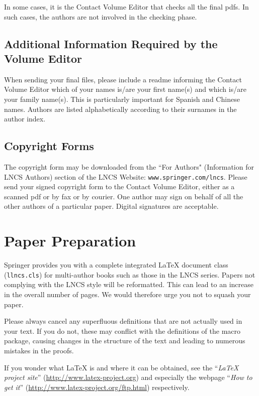 \documentclass[runningheads]{llncs}
\begin{document}
In some cases, it is the Contact Volume Editor that checks all the final
pdfs. In such cases, the authors are not involved in the checking phase.

\subsection{Additional Information Required by the Volume Editor}

When sending your final files, please include a readme informing the
Contact Volume Editor which of your names is/are your first name(s) and
which is/are your family name(s). This is particularly important for
Spanish and Chinese names. Authors are listed alphabetically according
to their surnames in the author index.

\subsection{Copyright Forms}

The copyright form may be downloaded from the ``For Authors"
(Information for LNCS Authors)
section of the LNCS Website: \texttt{www.springer.com/lncs}.
Please send your signed copyright
form to the Contact Volume Editor, either as a scanned pdf or by fax or
by courier. One author may sign on behalf of all the other authors of a particular
paper. Digital signatures are acceptable.

\section{Paper Preparation}

Springer
provides you with a complete integrated \LaTeX{} document class (\texttt{llncs.cls})
for multi-author books such as those in the LNCS series.
Papers not complying with the LNCS style will be reformatted. This can
lead to an increase in the overall number of pages. We would therefore
urge you not to squash your paper.

Please always cancel any superfluous definitions that are
not actually used in your text. If you do not, these may conflict with
the definitions of the macro package, causing changes in the structure
of the text and leading to numerous mistakes in the proofs.

If you wonder what \LaTeX{} is and where it can be obtained, see the
``\textit{LaTeX project site}'' (\url{http://www.latex-project.org})
and especially the webpage ``\textit{How to get it}''
(\url{http://www.latex-project.org/ftp.html}) respectively.
\end{document}
